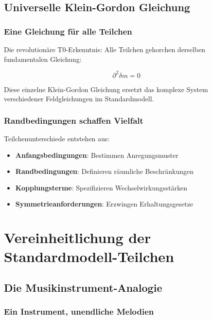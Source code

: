 	\subsection{Universelle Klein-Gordon Gleichung}
	\label{subsec:universelle_klein_gordon}
	
	\subsubsection{Eine Gleichung für alle Teilchen}
	\label{subsubsec:eine_gleichung}
	
	Die revolutionäre T0-Erkenntnis: Alle Teilchen gehorchen derselben fundamentalen Gleichung:
	
	\begin{equation}
		\boxed{\partial^2 \delta m = 0}
		\label{eq:universelle_gleichung}
	\end{equation}
	
	Diese einzelne Klein-Gordon Gleichung ersetzt das komplexe System verschiedener Feldgleichungen im Standardmodell.
	
	\subsubsection{Randbedingungen schaffen Vielfalt}
	\label{subsubsec:randbedingungen}
	
	Teilchenunterschiede entstehen aus:
	\begin{itemize}
		\item \textbf{Anfangsbedingungen}: Bestimmen Anregungsmuster
		\item \textbf{Randbedingungen}: Definieren räumliche Beschränkungen  
		\item \textbf{Kopplungsterme}: Spezifizieren Wechselwirkungsstärken
		\item \textbf{Symmetrieanforderungen}: Erzwingen Erhaltungsgesetze
	\end{itemize}
	
	\section{Vereinheitlichung der Standardmodell-Teilchen}
	\label{sec:sm_vereinheitlichung}
	
	\subsection{Die Musikinstrument-Analogie}
	\label{subsec:musikinstrument_analogie}
	
	\subsubsection{Ein Instrument, unendliche Melodien}
	\label{subsubsec:ein_instrument}
	
